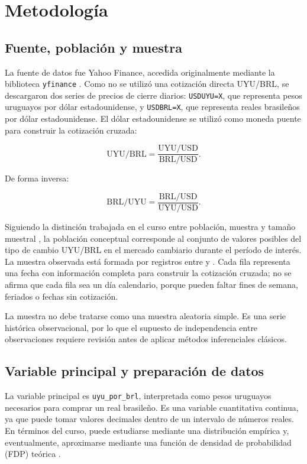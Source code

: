 \section{Metodología}

\subsection{Fuente, población y muestra}

La fuente de datos fue Yahoo Finance, accedida originalmente mediante la biblioteca \texttt{yfinance} \cite{yahoo_finance,yfinance}. Como no se utilizó una cotización directa UYU/BRL, se descargaron dos series de precios de cierre diarios: \texttt{USDUYU=X}, que representa pesos uruguayos por dólar estadounidense, y \texttt{USDBRL=X}, que representa reales brasileños por dólar estadounidense. El dólar estadounidense se utilizó como moneda puente para construir la cotización cruzada:

\[
    \text{UYU/BRL} = \frac{\text{UYU/USD}}{\text{BRL/USD}}.
\]

De forma inversa:

\[
    \text{BRL/UYU} = \frac{\text{BRL/USD}}{\text{UYU/USD}}.
\]

Siguiendo la distinción trabajada en el curso entre población, muestra y tamaño muestral \cite{curso_intro,curso_muestreo}, la población conceptual corresponde al conjunto de valores posibles del tipo de cambio UYU/BRL en el mercado cambiario durante el período de interés. La muestra observada está formada por \TotalRegistros{} registros entre \FechaMinima{} y \FechaMaxima{}. Cada fila representa una fecha con información completa para construir la cotización cruzada; no se afirma que cada fila sea un día calendario, porque pueden faltar fines de semana, feriados o fechas sin cotización.

La muestra no debe tratarse como una muestra aleatoria simple. Es una serie histórica observacional, por lo que el supuesto de independencia entre observaciones requiere revisión antes de aplicar métodos inferenciales clásicos.

\subsection{Variable principal y preparación de datos}

La variable principal es \texttt{uyu\_por\_brl}, interpretada como pesos uruguayos necesarios para comprar un real brasileño. Es una variable cuantitativa continua, ya que puede tomar valores decimales dentro de un intervalo de números reales. En términos del curso, puede estudiarse mediante una distribución empírica y, eventualmente, aproximarse mediante una función de densidad de probabilidad (FDP) teórica \cite{curso_continuas}.

